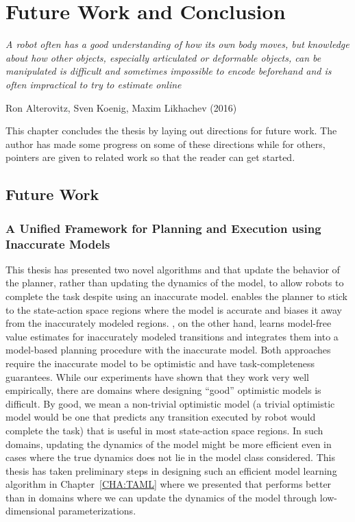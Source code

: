 
\chapter{Future Work and Conclusion}
\label{cha:future-work-concl}

\epigraph{\textit{A robot
    often has a good understanding of how its own body moves, but
    knowledge about how other objects, especially articulated or
    deformable objects, can be manipulated is difficult and
    sometimes impossible to encode beforehand and is often impractical
    to try to estimate online}}{Ron Alterovitz, Sven Koenig, Maxim
    Likhachev (2016)}

This chapter concludes the thesis by laying out directions for future
work. The author has made some progress on some of these directions
while for others, pointers are given to related work so that the
reader can get started.

\section{Future Work}
\label{sec:future-work}

\subsection{A Unified Framework for Planning and Execution using
  Inaccurate Models}
\label{sec:unified-framework}

This thesis has presented two novel algorithms \cmax{} and \cmaxpp{} that update the
behavior of the planner, rather than updating the dynamics of the
model, to allow robots to complete the task despite using an
inaccurate model. \cmax{} enables the planner to stick to the
state-action space regions where the model is accurate and biases it
away from the inaccurately modeled regions. \cmaxpp{}, on the other
hand, learns model-free value estimates for inaccurately modeled
transitions and integrates them into a model-based planning procedure
with the inaccurate model. Both approaches require the inaccurate
model to be optimistic and have task-completeness guarantees. While
our experiments have shown that they work very well empirically, there
are domains where designing ``good'' optimistic models is
difficult. By good, we mean a non-trivial optimistic model (a trivial
optimistic model would be one that predicts any transition executed by
robot would complete the task) that is useful in most state-action
space regions. In such domains, updating the dynamics of the model
might be more efficient even in cases where the true dynamics does not
lie in the model class considered. This thesis has taken preliminary
steps in designing such an efficient model learning algorithm in
Chapter~\ref{CHA:TAML} where we presented \taml{} that performs better
than \cmax{} in domains where we can update the dynamics of the model
through low-dimensional parameterizations.

